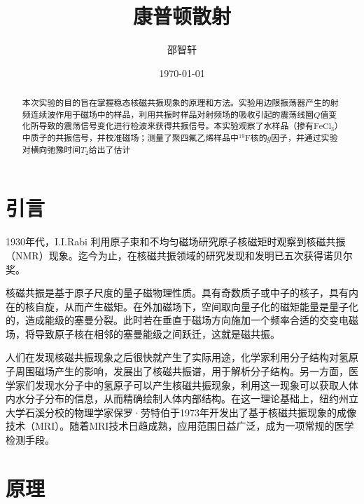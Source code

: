 \documentclass[aps,pre,12pt,preprint,onecolumn,showpacs,showkeys]{revtex4-1}
\def \F {^{19}\mathrm{F}}
\begin{document}
\title{\bf\heiti{}康普顿散射\vspace{15mm}}
\author{\fangsong{}邵智轩\vspace{2mm}}
\date{\today}

\begin{abstract}
\vspace{10mm}
\begin{spacing}{1.5}
\songti{}
本次实验的目的旨在掌握稳态核磁共振现象的原理和方法。实验用边限振荡器产生的射频连续波作用于磁场中的样品，利用共振时样品对射频场的吸收引起的震荡线圈$Q$值变化所导致的震荡信号变化进行检波来获得共振信号。本实验观察了水样品（掺有$\mathrm{FeCl_3}$）中质子的共振信号，并校准磁场；测量了聚四氟乙烯样品中$\F$核的$g$因子，并通过实验对横向弛豫时间$T_2$给出了估计

\end{spacing}
\end{abstract}
\maketitle
\songti{}

\section{引言}
1930年代，I.I.Rabi 利用原子束和不均匀磁场研究原子核磁矩时观察到核磁共振（NMR）现象。迄今为止，在核磁共振领域的研究发现和发明已五次获得诺贝尔奖。

核磁共振是基于原子尺度的量子磁物理性质。具有奇数质子或中子的核子，具有内在的核自旋，从而产生磁矩。在外加磁场下，空间取向量子化的磁矩能量是量子化的，造成能级的塞曼分裂。此时若在垂直于磁场方向施加一个频率合适的交变电磁场，将导致原子核在相邻的塞曼能级之间跃迁，这就是磁共振。

人们在发现核磁共振现象之后很快就产生了实际用途，化学家利用分子结构对氢原子周围磁场产生的影响，发展出了核磁共振谱，用于解析分子结构。另一方面，医学家们发现水分子中的氢原子可以产生核磁共振现象，利用这一现象可以获取人体内水分子分布的信息，从而精确绘制人体内部结构。在这一理论基础上，纽约州立大学石溪分校的物理学家保罗·劳特伯于1973年开发出了基于核磁共振现象的成像技术（MRI）。随着MRI技术日趋成熟，应用范围日益广泛，成为一项常规的医学检测手段。

\section{原理}
\end{document}
